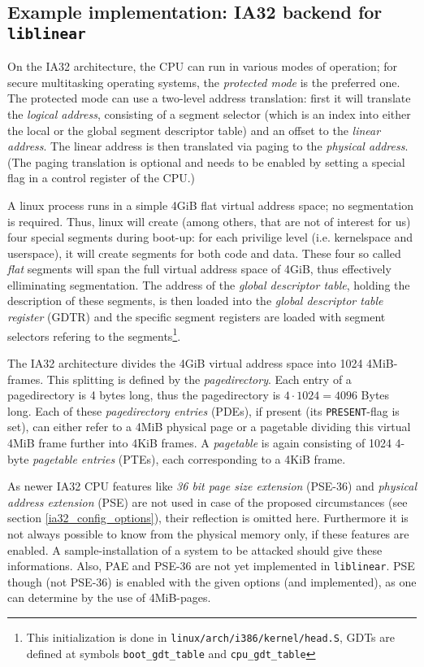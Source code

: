 \subsection{Example implementation: IA32 backend for \texttt{liblinear}}

On the IA32 architecture, the CPU can run in various modes of operation; for
secure multitasking operating systems, the \emph{protected mode} is the
preferred one.  The protected mode can use a two-level address translation:
first it will translate the \emph {logical address}, consisting of a segment
selector (which is an index into either the local or the global segment
descriptor table) and an offset to the \emph{linear address}.  The linear
address is then translated via paging to the \emph{physical address}. (The
paging translation is optional and needs to be enabled by setting a special flag
in a control register of the CPU.)

\label{linux_gdt} A linux process runs in a simple 4GiB flat virtual address
space; no segmentation is required. Thus, linux will create (among others, that
are not of interest for us) four special segments during boot-up: for each
privilige level (i.e. kernelspace and userspace), it will create segments for
both code and data. These four so called \emph{flat} segments will span the full
virtual address space of 4GiB, thus effectively elliminating segmentation. The
address of the \emph{global descriptor table}, holding the description of these
segments, is then loaded into the \emph{global descriptor table register} (GDTR)
and the specific segment registers are loaded with segment selectors refering to
the segments\footnote{This initialization is done in
\texttt{linux/arch/i386/kernel/head.S}, GDTs are defined at symbols
\texttt{boot\_gdt\_table} and \texttt{cpu\_gdt\_table}}.

The IA32 architecture divides the 4GiB virtual address space into 1024
4MiB-frames. This splitting is defined by the \emph{pagedirectory}. Each entry
of a pagedirectory is 4 bytes long, thus the pagedirectory is $4 \cdot 1024 =
4096$ Bytes long. Each of these \emph{pagedirectory entries} (PDEs), if present
(its \texttt{PRESENT}-flag is set), can either refer to a 4MiB physical page or
a pagetable dividing this virtual 4MiB frame further into 4KiB frames. A
\emph{pagetable} is again consisting of 1024 4-byte \emph{pagetable entries}
(PTEs), each corresponding to a 4KiB frame.

As newer IA32 CPU features like \emph{36 bit page size extension} (PSE-36) and
\emph{physical address extension} (PSE) are not used in case of the proposed
circumstances (see section \ref{ia32_config_options}), their reflection is
omitted here.  Furthermore it is not always possible to know from the physical
memory only, if these features are enabled.  A sample-installation of a system
to be attacked should give these informations. Also, PAE and PSE-36 are not yet
implemented in \texttt{liblinear}. PSE though (not PSE-36) is enabled with the
given options (and implemented), as one can determine by the use of 4MiB-pages.


